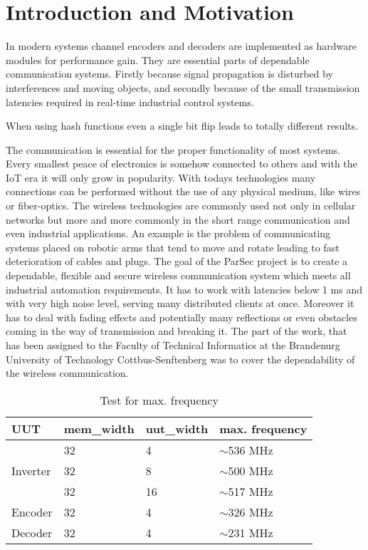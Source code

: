 \chapter{Introduction and Motivation} \label{ch:int}



In modern systems channel encoders and decoders are implemented as hardware modules for performance gain. They are essential parts of dependable communication systems. Firstly because signal propagation is disturbed by interferences and moving objects, and secondly because of the small transmission latencies required in real-time industrial control systems.

When using hash functions even a single bit flip leads to totally different results.

The communication is essential for the proper functionality of most systems. Every smallest peace of electronics is somehow connected to others and with the IoT era it will only grow in popularity. With todays technologies many connections can be performed without the use of any physical medium, like wires or fiber-optics. The wireless technologies are commonly used not only in cellular networks but more and more commonly in the short range communication and even industrial applications. An example is the problem of communicating systems placed on robotic arms that tend to move and rotate leading to fast deterioration of cables and plugs.
The goal of the ParSec project is to create a dependable, flexible and secure wireless communication system which meets all industrial automation requirements. It has to work with latencies below 1 ms and with very high noise level, serving many distributed clients at once. Moreover it has to deal with fading effects and potentially many reflections or even obstacles coming in the way of transmission and breaking it. The part of the work, that has been assigned to the Faculty of Technical Informatics at the Brandenurg University of Technology Cottbus-Senftenberg was to cover the dependability of the wireless communication. 

\begin{table}[]
\label{tab:max_freq}
\begin{tabular}{@{}llll@{}}
\toprule
UUT                       &mem\_width   &uut\_width &max. frequency \\ 
\midrule
\multirow{3}{*}{Inverter} &32           &4       & $\sim$536 MHz\\ 
                          & 32          & 8      & $\sim$500 MHz \\  
                          & 32          & 16     & $\sim$517 MHz \\ 
\midrule
Encoder                   & 32          & 4      & $\sim$326 MHz \\ 
\midrule
Decoder                   & 32          & 4      & $\sim$231 MHz \\  
\bottomrule
\end{tabular}
\centering
\caption{Test for max. frequency}
\end{table}

